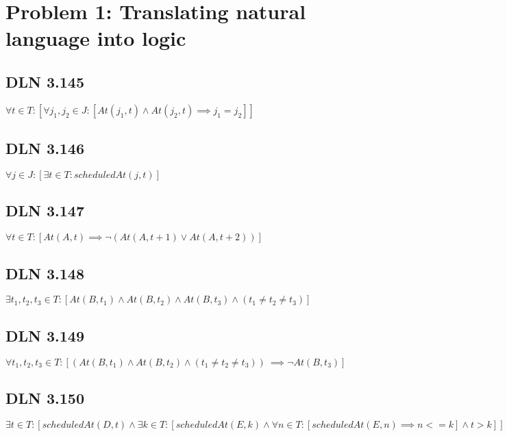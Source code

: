 \documentclass[titlepage]{article}
\begin{document}
 \maketitle

\section{Problem 1: Translating natural language into logic}


\subsection{DLN 3.145} 

\( \forall t \in T: [ \forall j_1, j_2 \in J :[At(j_1, t) \land At(j_2, t) \implies j_1 = j_2 ] ]\)

\subsection{DLN 3.146} 

\( \forall j \in J:[ \exists t \in T: scheduledAt(j,t)] \)

\subsection{DLN 3.147} 

\( \forall t \in T:[ At(A, t) \implies \lnot (At(A, t +1) \lor At(A, t+2))] \)

\subsection{DLN 3.148} 

\( \exists t_1, t_2, t_3 \in T:[At(B, t_1) \land At(B, t_2) \land At(B, t_3) \land (t_1 \neq t_2 \neq t_3)] \)

\subsection{DLN 3.149} 

\( \forall t_1, t_2, t_3 \in T: [(At(B, t_1) \land At(B, t_2) \land (t_1 \neq t_2 \neq t_3)) \ \implies \lnot At(B, t_3)] \)

\subsection{DLN 3.150} 

\( \exists t \in T: \left[ scheduledAt(D, t) \land \exists k \in T: \left[ scheduledAt(E, k) \land \forall n \in T:\left[ scheduledAt(E, n) \implies n <= k \right] \land t > k  \right] \right] \)
\end{document}
